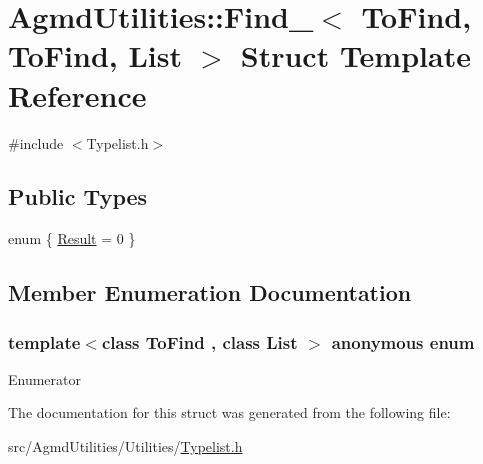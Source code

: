 \hypertarget{struct_agmd_utilities_1_1_find___3_01_to_find_00_01_to_find_00_01_list_01_4}{\section{Agmd\+Utilities\+:\+:Find\+\_\+$<$ To\+Find, To\+Find, List $>$ Struct Template Reference}
\label{struct_agmd_utilities_1_1_find___3_01_to_find_00_01_to_find_00_01_list_01_4}
}


{\ttfamily \#include $<$Typelist.\+h$>$}

\subsection*{Public Types}
\begin{DoxyCompactItemize}
\item 
enum \{ \hyperlink{struct_agmd_utilities_1_1_find___3_01_to_find_00_01_to_find_00_01_list_01_4_af00b429dcd4add137f357dd29d5e8718a9ac7a719e7c15e9f89e695ae877bb171}{Result} = 0
 \}
\end{DoxyCompactItemize}


\subsection{Member Enumeration Documentation}
\hypertarget{struct_agmd_utilities_1_1_find___3_01_to_find_00_01_to_find_00_01_list_01_4_af00b429dcd4add137f357dd29d5e8718}{\subsubsection[{anonymous enum}]{\setlength{\rightskip}{0pt plus 5cm}template$<$class To\+Find , class List $>$ anonymous enum}}\label{struct_agmd_utilities_1_1_find___3_01_to_find_00_01_to_find_00_01_list_01_4_af00b429dcd4add137f357dd29d5e8718}
\begin{Desc}
\item[Enumerator]\par
\begin{description}
\item[{\em 
\hypertarget{struct_agmd_utilities_1_1_find___3_01_to_find_00_01_to_find_00_01_list_01_4_af00b429dcd4add137f357dd29d5e8718a9ac7a719e7c15e9f89e695ae877bb171}{Result}\label{struct_agmd_utilities_1_1_find___3_01_to_find_00_01_to_find_00_01_list_01_4_af00b429dcd4add137f357dd29d5e8718a9ac7a719e7c15e9f89e695ae877bb171}
}]\end{description}
\end{Desc}


The documentation for this struct was generated from the following file\+:\begin{DoxyCompactItemize}
\item 
src/\+Agmd\+Utilities/\+Utilities/\hyperlink{_typelist_8h}{Typelist.\+h}\end{DoxyCompactItemize}
